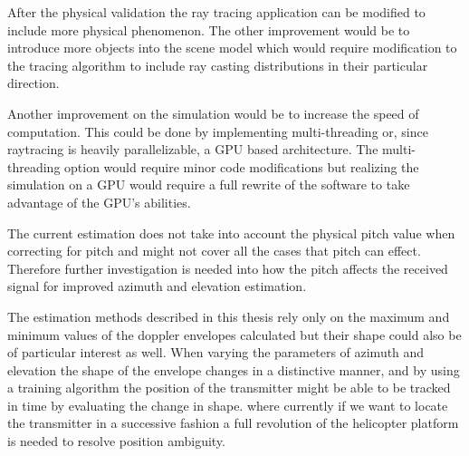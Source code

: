After the physical validation the ray tracing application can be modified to include more physical phenomenon. The other improvement would be to introduce more objects into the scene model which would require modification to the tracing algorithm to include ray casting distributions in their particular direction.

Another improvement on the simulation would be to increase the speed of computation. This could be done by implementing multi-threading or, since raytracing is heavily parallelizable, a GPU based architecture. The multi-threading option would require minor code modifications but realizing the simulation on a GPU would require a full rewrite of the software to take advantage of the GPU's abilities. 

The current estimation does not take into account the physical pitch value when correcting for pitch and might not cover all the cases that pitch can effect. Therefore further investigation is needed into how the pitch affects the received signal for improved azimuth and elevation estimation.

The estimation methods described in this thesis rely only on the maximum and minimum values of the doppler envelopes calculated but their shape could also be of particular interest as well. When varying the parameters of azimuth and elevation the shape of the envelope changes in a distinctive manner, and by using a training algorithm the position of the transmitter might be able to be tracked in time by evaluating the change in shape. where currently if we want to locate the transmitter in a successive fashion a full revolution of the helicopter platform is needed to resolve position ambiguity.
 
